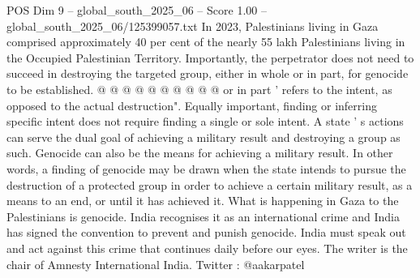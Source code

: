 \begin{textsample}{POS Dim 9 – global\_south\_2025\_06 – Score 1.00 – global\_south\_2025\_06/125399057.txt}
In 2023, Palestinians living in Gaza comprised approximately 40 per cent of the nearly 55 lakh Palestinians living in the Occupied Palestinian Territory.
Importantly, the perpetrator does not need to succeed in destroying the targeted group, either in whole or in part, for genocide to be established. @ @ @ @ @ @ @ @ @ @ or in part ' refers to the intent, as opposed to the actual destruction".
Equally important, finding or inferring specific intent does not require finding a single or sole intent.
A state ' s actions can serve the dual goal of achieving a military result and destroying a group as such.
Genocide can also be the means for achieving a military result.
In other words, a finding of genocide may be drawn when the state intends to pursue the destruction of a protected group in order to achieve a certain military result, as a means to an end, or until it has achieved it.
What is happening in Gaza to the Palestinians is genocide.
India recognises it as an international crime and India has signed the convention to prevent and punish genocide.
India must speak out and act against this crime that continues daily before our eyes.
The writer is the chair of Amnesty International India.
Twitter : @aakarpatel

\end{textsample}
